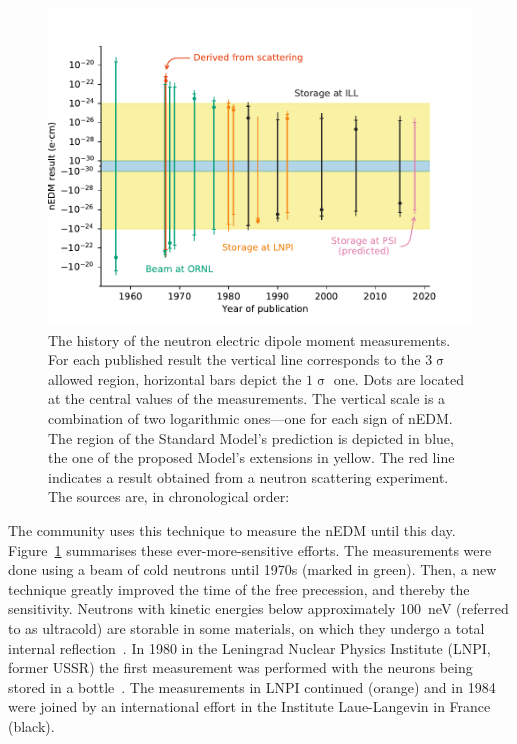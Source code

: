 \begin{figure}
  \centering
  \includegraphics[width=\linewidth]{gfx/introduction/edm_limits.pdf}
  \caption{The history of the neutron electric dipole moment measurements. For each published result the vertical line corresponds to the $3\upsigma$ allowed region, horizontal bars depict the $1\upsigma$ one. Dots are located at the central values of the measurements. The vertical scale is a combination of two logarithmic ones---one for each sign of nEDM. The region of the Standard Model's prediction is depicted in blue, the one of the proposed Model's extensions in yellow. The red line indicates a result obtained from a neutron scattering experiment. The sources are, in chronological order:~\cite{PhysRev.108.120,PhysRevLett.19.381,PhysRevLett.19.384,PhysRev.170.1200,PhysRev.179.1285,PhysRevD.7.3147,PhysRevD.15.9,ALTAREV1980269,ALTAREV198113,altarev1986search,ALTAREV1992242,PENDLEBURY1984327,SMITH1990191,PhysRevLett.82.904,PhysRevLett.97.131801,Pendlebury2015}}
  \label{fig:nEDM_limits_history}
\end{figure}

The community uses this technique to measure the nEDM until this day. Figure~\ref{fig:nEDM_limits_history} summarises these ever-more-sensitive efforts. The measurements were done using a beam of cold neutrons until 1970s (marked in green). Then, a new technique greatly improved the time of the free precession, and thereby the sensitivity. Neutrons with kinetic energies below approximately \SI{100}{\nano\electronvolt} (referred to as ultracold) are storable in some materials, on which they undergo a total internal reflection~\cite{UCNbook}. In 1980 in the Leningrad Nuclear Physics Institute (LNPI, former USSR) the first measurement was performed with the neurons being stored in a bottle~\cite{ALTAREV1980269}. The measurements in LNPI continued (orange) and in 1984 were joined by an international effort in the Institute Laue-Langevin in France (black).

